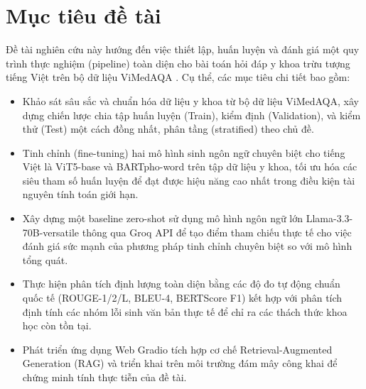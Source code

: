 \section{Mục tiêu đề tài}
Đề tài nghiên cứu này hướng đến việc thiết lập, huấn luyện và đánh giá một quy trình thực nghiệm (pipeline) toàn diện cho bài toán hỏi đáp y khoa trừu tượng tiếng Việt trên bộ dữ liệu ViMedAQA \cite{tran2024vimedaqa}. Cụ thể, các mục tiêu chi tiết bao gồm:
\begin{itemize}
  \item Khảo sát sâu sắc và chuẩn hóa dữ liệu y khoa từ bộ dữ liệu ViMedAQA, xây dựng chiến lược chia tập huấn luyện (Train), kiểm định (Validation), và kiểm thử (Test) một cách đồng nhất, phân tầng (stratified) theo chủ đề.
  \item Tinh chỉnh (fine-tuning) hai mô hình sinh ngôn ngữ chuyên biệt cho tiếng Việt là ViT5-base và BARTpho-word trên tập dữ liệu y khoa, tối ưu hóa các siêu tham số huấn luyện để đạt được hiệu năng cao nhất trong điều kiện tài nguyên tính toán giới hạn.
  \item Xây dựng một baseline zero-shot sử dụng mô hình ngôn ngữ lớn Llama-3.3-70B-versatile thông qua Groq API để tạo điểm tham chiếu thực tế cho việc đánh giá sức mạnh của phương pháp tinh chỉnh chuyên biệt so với mô hình tổng quát.
  \item Thực hiện phân tích định lượng toàn diện bằng các độ đo tự động chuẩn quốc tế (ROUGE-1/2/L, BLEU-4, BERTScore F1) kết hợp với phân tích định tính các nhóm lỗi sinh văn bản thực tế để chỉ ra các thách thức khoa học còn tồn tại.
  \item Phát triển ứng dụng Web Gradio tích hợp cơ chế Retrieval-Augmented Generation (RAG) và triển khai trên môi trường đám mây công khai để chứng minh tính thực tiễn của đề tài.
\end{itemize}

